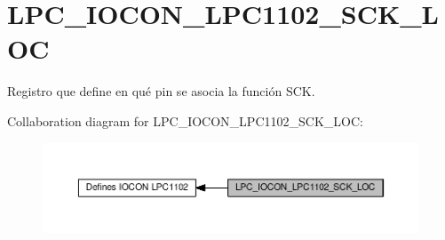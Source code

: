 \hypertarget{group___l_p_c___i_o_c_o_n___l_p_c1102___s_c_k___l_o_c}{}\section{L\+P\+C\+\_\+\+I\+O\+C\+O\+N\+\_\+\+L\+P\+C1102\+\_\+\+S\+C\+K\+\_\+\+L\+OC}
\label{group___l_p_c___i_o_c_o_n___l_p_c1102___s_c_k___l_o_c}


Registro que define en qué pin se asocia la función S\+CK.  


Collaboration diagram for L\+P\+C\+\_\+\+I\+O\+C\+O\+N\+\_\+\+L\+P\+C1102\+\_\+\+S\+C\+K\+\_\+\+L\+OC\+:\nopagebreak
\begin{figure}[H]
\begin{center}
\leavevmode
\includegraphics[width=350pt]{group___l_p_c___i_o_c_o_n___l_p_c1102___s_c_k___l_o_c}
\end{center}
\end{figure}
